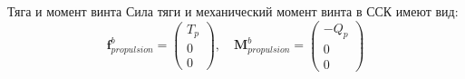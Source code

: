 \documentclass[aspectratio=169, plain, 14pt]{beamer}
\begin{document}
\begin{frame}{Тяга и момент винта}
	\justifying\small
	Сила тяги и механический момент винта в ССК имеют вид:
	$$
	\boldsymbol{f}^b_{propulsion} = \begin{pmatrix}
		T_p \\ 0 \\ 0
	\end{pmatrix}, \quad \boldsymbol{M}^b_{propulsion} = \begin{pmatrix}
		-Q_p \\ 0 \\ 0
	\end{pmatrix}
	$$
\end{frame}
\end{document}
